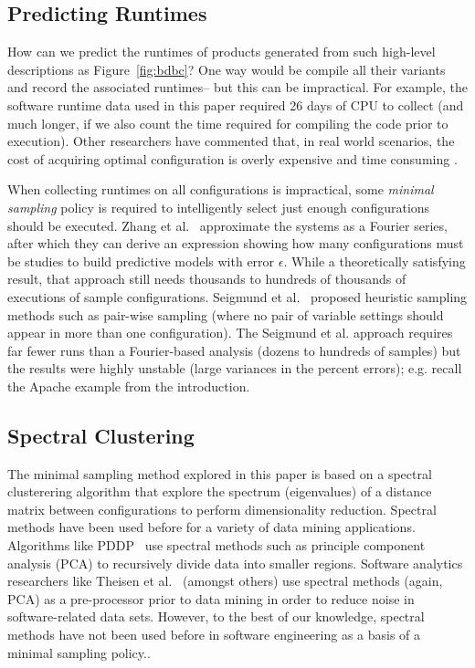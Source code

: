 \documentclass{sig-alternative}
\newcommand{\fig}[1]{Figure~\ref{fig:#1}}
\begin{document}
\subsection{Predicting Runtimes}
How can we predict the runtimes of products generated from such high-level descriptions
as \fig{bdbc}? One way would be compile all their variants and record the associated runtimes--
but this can be impractical.
For example, the software runtime data used in this paper required  26 days of CPU to collect (and much longer, if we also count the time required
 for compiling the code prior to execution). 
 Other researchers have commented that,  in 
 real world scenarios, the cost of acquiring optimal configuration is overly expensive and time consuming \cite{weiss2008maximizing}.
 
 When collecting runtimes on all configurations is impractical,  some {\em minimal sampling} policy
 is required to intelligently select just enough configurations should be executed.
 Zhang et al.~\cite{zhang2015performance} approximate the
 systems as a Fourier series, after which they can derive an expression showing how many configurations must be studies
 to build predictive models with error $\epsilon$. While a theoretically satisfying result, that approach still needs thousands to hundreds of thousands of executions of sample
 configurations.  Seigmund et al.~\cite{siegmund2012predicting} proposed heuristic
 sampling methods such as pair-wise sampling (where no pair of 
 variable settings should appear in more than one configuration). The  Seigmund et al. approach  requires far fewer runs than a Fourier-based analysis (dozens to hundreds of samples) but the results were highly unstable (large variances
 in the percent errors); e.g. recall the Apache example from the introduction.
 

\subsection{Spectral Clustering}\label{sect:spect}

The minimal sampling method explored in this paper is based on a spectral clusterering algorithm
that  explore the spectrum (eigenvalues) of a distance matrix between  configurations to  perform dimensionality  reduction.
Spectral methods have been used before for a variety of data mining applications.
Algorithms like PDDP~\cite{boley98} use spectral methods such as principle component analysis (PCA) to
recursively divide data into smaller regions.  Software analytics researchers like Theisen et al.~\cite{Theisen15} (amongst
others) use spectral methods (again, PCA) as a pre-processor prior to data mining in order to reduce noise in software-related data sets.
However, to the best of our knowledge, spectral methods have not been used before in software engineering as a basis 
of a minimal sampling policy.. 
\end{document}
